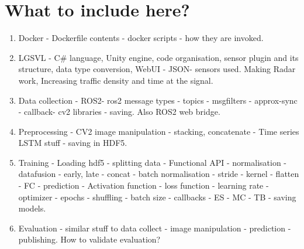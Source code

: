\section{What to include here?}

\begin{enumerate}
    \item Docker - Dockerfile contents - docker scripts - how they are invoked.
    \item LGSVL - C\# language, Unity engine, code organisation, sensor plugin and its
        structure, data type conversion, WebUI - JSON- sensors used. Making Radar work,
        Increasing traffic density and time at the signal.
    \item Data collection - ROS2- ros2 message types - topics - msgfilters -
        approx-sync - callback- cv2 libraries - saving. Also ROS2 web bridge.
    \item Preprocessing - CV2 image manipulation - stacking, concatenate  -
        Time series LSTM stuff - saving in HDF5.
    \item Training - Loading hdf5 - splitting data - Functional API - normalisation
        - datafusion - early, late - concat - batch normalisation - stride - kernel -
        flatten - FC - prediction - Activation function - loss function - learning rate -
        optimizer - epochs - shuffling - batch size - callbacks - ES - MC - TB - saving
        models.
    \item Evaluation - similar stuff to data collect - image manipulation - prediction -
        publishing. How to validate evaluation?

\end{enumerate}

\fi
